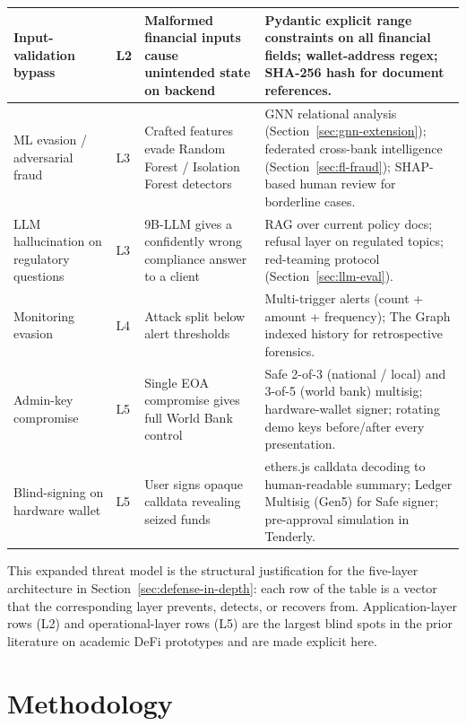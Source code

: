 \documentclass[12pt,a4paper]{report}
\begin{document}
\begin{table}[H]
\begin{tabular}{p{2.6cm}p{2.0cm}p{4.5cm}p{4.8cm}}
\hline
Input-validation bypass & L2 & Malformed financial inputs cause unintended state on backend & Pydantic explicit range constraints on all financial fields; wallet-address regex; SHA-256 hash for document references. \\
\hline
ML evasion / adversarial fraud & L3 & Crafted features evade Random Forest / Isolation Forest detectors & GNN relational analysis (Section~\ref{sec:gnn-extension}); federated cross-bank intelligence (Section~\ref{sec:fl-fraud}); SHAP-based human review for borderline cases. \\
\hline
LLM hallucination on regulatory questions & L3 & 9B-LLM gives a confidently wrong compliance answer to a client & RAG over current policy docs; refusal layer on regulated topics; red-teaming protocol (Section~\ref{sec:llm-eval}). \\
\hline
Monitoring evasion & L4 & Attack split below alert thresholds & Multi-trigger alerts (count + amount + frequency); The Graph indexed history for retrospective forensics. \\
\hline
Admin-key compromise & L5 & Single EOA compromise gives full World Bank control & Safe 2-of-3 (national / local) and 3-of-5 (world bank) multisig; hardware-wallet signer; rotating demo keys before/after every presentation. \\
\hline
Blind-signing on hardware wallet & L5 & User signs opaque calldata revealing seized funds & ethers.js calldata decoding to human-readable summary; Ledger Multisig (Gen5) for Safe signer; pre-approval simulation in Tenderly. \\
\hline
\end{tabular}
\end{table}

This expanded threat model is the structural justification for the five-layer architecture in Section~\ref{sec:defense-in-depth}: each row of the table is a vector that the corresponding layer prevents, detects, or recovers from. Application-layer rows (L2) and operational-layer rows (L5) are the largest blind spots in the prior literature on academic DeFi prototypes and are made explicit here.


\chapter{Methodology}
\end{document}
